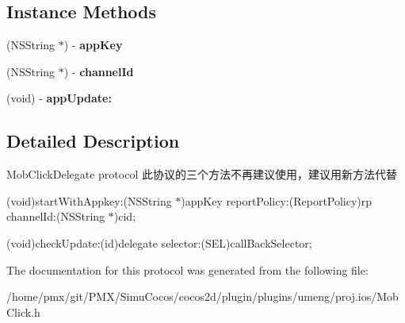 \subsection*{Instance Methods}
\begin{DoxyCompactItemize}
\item 
\mbox{\label{protocolMobClickDelegate_01-p_ab2943a576d8ebf44bbb7e34ca2704340}} 
(N\+S\+String $\ast$) -\/ {\bfseries app\+Key}
\item 
\mbox{\label{protocolMobClickDelegate_01-p_adeedb19ee0a5d0b547624ea20f634288}} 
(N\+S\+String $\ast$) -\/ {\bfseries channel\+Id}
\item 
\mbox{\label{protocolMobClickDelegate_01-p_a11970aab9efc5d7b8e618738ebbe701a}} 
(void) -\/ {\bfseries app\+Update\+:}
\end{DoxyCompactItemize}


\subsection{Detailed Description}
Mob\+Click\+Delegate protocol 此协议的三个方法不再建议使用，建议用新方法代替
\begin{DoxyItemize}
\item (void)start\+With\+Appkey\+:(\+N\+S\+String $\ast$)app\+Key report\+Policy\+:(\+Report\+Policy)rp channel\+Id\+:(\+N\+S\+String $\ast$)cid;
\item (void)check\+Update\+:(id)delegate selector\+:(\+S\+E\+L)call\+Back\+Selector; 
\end{DoxyItemize}

The documentation for this protocol was generated from the following file\+:\begin{DoxyCompactItemize}
\item 
/home/pmx/git/\+P\+M\+X/\+Simu\+Cocos/cocos2d/plugin/plugins/umeng/proj.\+ios/Mob\+Click.\+h\end{DoxyCompactItemize}
